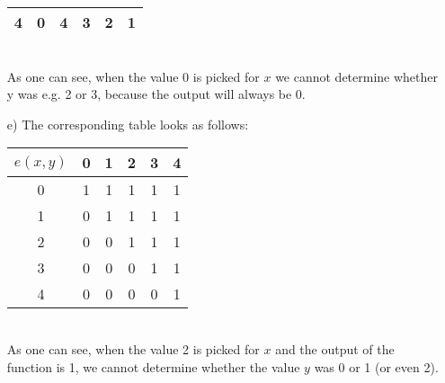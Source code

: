 \documentclass{article}
\begin{document}
\begin{adjustwidth}{2em}{2em}
\begin{enumerate}
\begin{tabular}{| c | c | c | c | c | c |}
				4 & 0 & \cellcolor[gray]{0.8}4 & \cellcolor[gray]{0.8}3 & \cellcolor[gray]{0.8}2 & \cellcolor[gray]{0.8}1 \\
				\hline
			\end{tabular} \\
			As one can see, when the value 0 is picked for $x$ we cannot determine whether y was e.g. 2 or 3, because the output will always be 0.
			\item[e)] The corresponding table looks as follows: \\
			\begin{tabular}{| c | c | c | c | c | c |}
				\hline
				$e(x,y)$ & 0 & 1 & 2 & 3 & 4 \\
				\hline
				0 & \cellcolor[gray]{0.8}1 & \cellcolor[gray]{0.8}1 & 1 & \cellcolor[gray]{0.8}1 & \cellcolor[gray]{0.8}1 \\
				1 & \cellcolor[gray]{0.8}0 & \cellcolor[gray]{0.8}1 & 1 & \cellcolor[gray]{0.8}1 & \cellcolor[gray]{0.8}1 \\
				2 & \cellcolor[gray]{0.8}0 & \cellcolor[gray]{0.8}0 & 1 & \cellcolor[gray]{0.8}1 & \cellcolor[gray]{0.8}1 \\
				3 & \cellcolor[gray]{0.8}0 & \cellcolor[gray]{0.8}0 & 0 & \cellcolor[gray]{0.8}1 & \cellcolor[gray]{0.8}1 \\
				4 & \cellcolor[gray]{0.8}0 & \cellcolor[gray]{0.8}0 & 0 & \cellcolor[gray]{0.8}0 & \cellcolor[gray]{0.8}1 \\
				\hline
			\end{tabular} \\
			As one can see, when the value 2 is picked for $x$ and the output of the function is 1, we cannot determine whether the value $y$ was 0 or 1 (or even 2).
		\end{enumerate}
	\end{adjustwidth}
\end{document}
